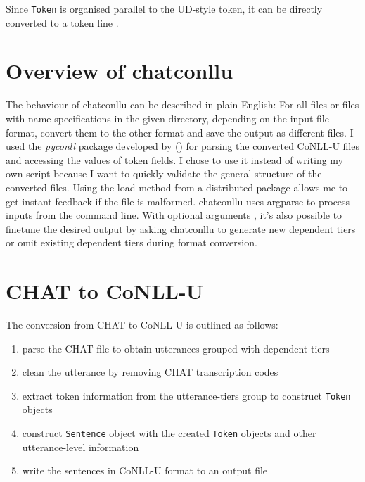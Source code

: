 Since \texttt{Token} is organised parallel to the UD-style token, it can be directly converted to a token line .

\section{Overview of chatconllu}


The behaviour of chatconllu can be described in plain English: For all files or files with name specifications in the given directory, depending on the input file format, convert them to the other format and save the output as different files. I used the \emph{pyconll}  package developed by (\cite{pyconll}) for parsing the converted CoNLL-U files and accessing the values of token fields. I chose to use it instead of writing my own script because I want to quickly validate the general structure of the converted files. Using the load method from a distributed package allows me to get instant feedback if the file is malformed. chatconllu uses argparse to process inputs from the command line. With optional arguments , it's also possible to finetune the desired output by asking chatconllu to generate new dependent tiers or omit existing dependent tiers during format conversion.


\section{CHAT to CoNLL-U}

The conversion from CHAT to CoNLL-U is outlined as follows:
\begin{enumerate}
	\item parse the CHAT file to obtain utterances grouped with dependent tiers
	\item clean the utterance by removing CHAT transcription codes
	\item extract token information from the utterance-tiers group to construct \texttt{Token} objects
	\item construct \texttt{Sentence} object with the created \texttt{Token} objects and other utterance-level information
	\item write the sentences in CoNLL-U format to an output file
\end{enumerate}

